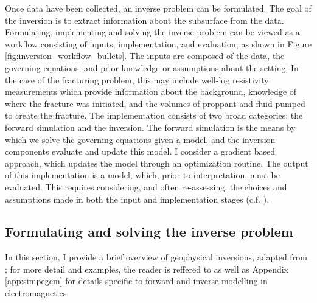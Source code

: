 Once data have been collected, an inverse problem can be formulated. The goal of the inversion is to extract information about the subsurface from the data. Formulating, implementing and solving the inverse problem can be viewed as a workflow consisting of inputs, implementation, and evaluation, as shown in Figure \ref{fig:inversion_workflow_bullets}. The inputs are composed of the data, the governing equations, and prior knowledge or assumptions about the setting. In the case of the fracturing problem, this may include well-log resistivity measurements which provide information about the background, knowledge of where the fracture was initiated, and the volumes of proppant and fluid pumped to create the fracture.
The implementation consists of two broad categories: the forward simulation and the inversion. The forward simulation is the means by which we solve the governing equations given a model, and the inversion components evaluate and update this model. I consider a gradient based approach, which updates the model through an optimization routine. The output of this implementation is a model, which, prior to interpretation, must be evaluated. This requires considering, and often re-assessing, the choices and assumptions made in both the input and implementation stages (c.f. \cite{Oldenburg2005, Haber2014a, Cockett2015}).



\subsection{Formulating and solving the inverse problem}
In this section, I provide a brief overview of geophysical inversions, adapted from \cite{Cockett2015}; for more detail and examples, the reader is reffered to \cite{Oldenburg2005, Cockett2015} as well as Appendix \ref{app:simpegem} for details specific to forward and inverse modelling in electromagnetics.


